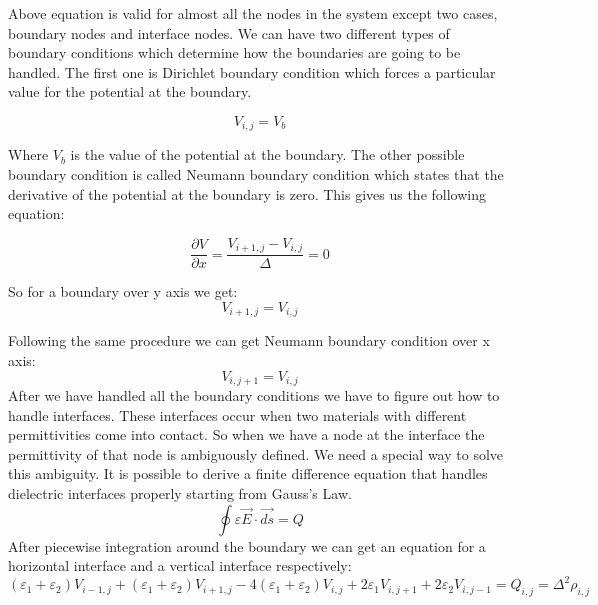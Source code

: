 Above equation is valid for almost all the nodes in the system except two cases, boundary nodes and interface nodes. We can have two different types of boundary conditions which determine how the boundaries are going to be handled. The first one is Dirichlet boundary condition which forces a particular value for the potential at the boundary.

\begin{equation}
V_{i,j}=V_{b}
\label{dirichlet}
\end{equation}

Where $V_{b}$ is the value of the potential at the boundary. The other possible boundary condition is called Neumann boundary condition which states that the derivative of the potential at the boundary is zero. This gives us the following equation:

\begin{equation}
\frac{\partial V}{\partial x}=\frac{V_{i+1,j}-V_{i,j}}{\Delta}=0
\end{equation}

So for a boundary over y axis we get:
\begin{equation}
V_{i+1,j}=V_{i,j}
\end{equation}

Following the same procedure we can get Neumann boundary condition over x axis:
\begin{equation}
V_{i,j+1}=V_{i,j}
\end{equation}
After we have handled all the boundary conditions we have to figure out how to handle interfaces. These interfaces occur when two materials with different permittivities come into contact. So when we have a node at the interface the permittivity of that node is ambiguously defined. We need a special way to solve this ambiguity. It is possible to derive a finite difference equation that handles dielectric interfaces properly starting from Gauss's Law.
\begin{equation}
\oint \varepsilon \vec{E} \cdot \vec{ds}=Q
\end{equation}
After piecewise integration around the boundary we can get an equation for a horizontal interface and a vertical interface respectively:
\begin{equation}
(\varepsilon_1+\varepsilon_2)V_{i-1,j}+(\varepsilon_1+\varepsilon_2)V_{i+1,j}-4(\varepsilon_1+\varepsilon_2)V_{i,j}+2\varepsilon_1 V_{i,j+1}+2\varepsilon_2 V_{i,j-1}=Q_{i,j}=\Delta^2\rho_{i,j}
\label{inth}
\end{equation}

